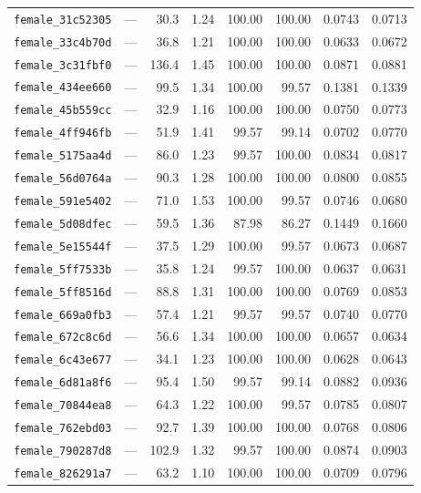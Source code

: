 \documentclass[11pt]{article}
\begin{document}
\begin{longtable}{lrrrrrrr}
\texttt{female\_31c52305} & --- & 30.3 & 1.24 & 100.00 & 100.00 & 0.0743 & 0.0713 \\
\texttt{female\_33c4b70d} & --- & 36.8 & 1.21 & 100.00 & 100.00 & 0.0633 & 0.0672 \\
\texttt{female\_3c31fbf0} & --- & 136.4 & 1.45 & 100.00 & 100.00 & 0.0871 & 0.0881 \\
\texttt{female\_434ee660} & --- & 99.5 & 1.34 & 100.00 & 99.57 & 0.1381 & 0.1339 \\
\texttt{female\_45b559cc} & --- & 32.9 & 1.16 & 100.00 & 100.00 & 0.0750 & 0.0773 \\
\texttt{female\_4ff946fb} & --- & 51.9 & 1.41 & 99.57 & 99.14 & 0.0702 & 0.0770 \\
\texttt{female\_5175aa4d} & --- & 86.0 & 1.23 & 99.57 & 100.00 & 0.0834 & 0.0817 \\
\texttt{female\_56d0764a} & --- & 90.3 & 1.28 & 100.00 & 100.00 & 0.0800 & 0.0855 \\
\texttt{female\_591e5402} & --- & 71.0 & 1.53 & 100.00 & 99.57 & 0.0746 & 0.0680 \\
\texttt{female\_5d08dfec} & --- & 59.5 & 1.36 & 87.98 & 86.27 & 0.1449 & 0.1660 \\
\texttt{female\_5e15544f} & --- & 37.5 & 1.29 & 100.00 & 99.57 & 0.0673 & 0.0687 \\
\texttt{female\_5ff7533b} & --- & 35.8 & 1.24 & 99.57 & 100.00 & 0.0637 & 0.0631 \\
\texttt{female\_5ff8516d} & --- & 88.8 & 1.31 & 100.00 & 100.00 & 0.0769 & 0.0853 \\
\texttt{female\_669a0fb3} & --- & 57.4 & 1.21 & 99.57 & 99.57 & 0.0740 & 0.0770 \\
\texttt{female\_672c8c6d} & --- & 56.6 & 1.34 & 100.00 & 100.00 & 0.0657 & 0.0634 \\
\texttt{female\_6c43e677} & --- & 34.1 & 1.23 & 100.00 & 100.00 & 0.0628 & 0.0643 \\
\texttt{female\_6d81a8f6} & --- & 95.4 & 1.50 & 99.57 & 99.14 & 0.0882 & 0.0936 \\
\texttt{female\_70844ea8} & --- & 64.3 & 1.22 & 100.00 & 99.57 & 0.0785 & 0.0807 \\
\texttt{female\_762ebd03} & --- & 92.7 & 1.39 & 100.00 & 100.00 & 0.0768 & 0.0806 \\
\texttt{female\_790287d8} & --- & 102.9 & 1.32 & 99.57 & 100.00 & 0.0874 & 0.0903 \\
\texttt{female\_826291a7} & --- & 63.2 & 1.10 & 100.00 & 100.00 & 0.0709 & 0.0796 \\

\end{longtable}
\end{document}
